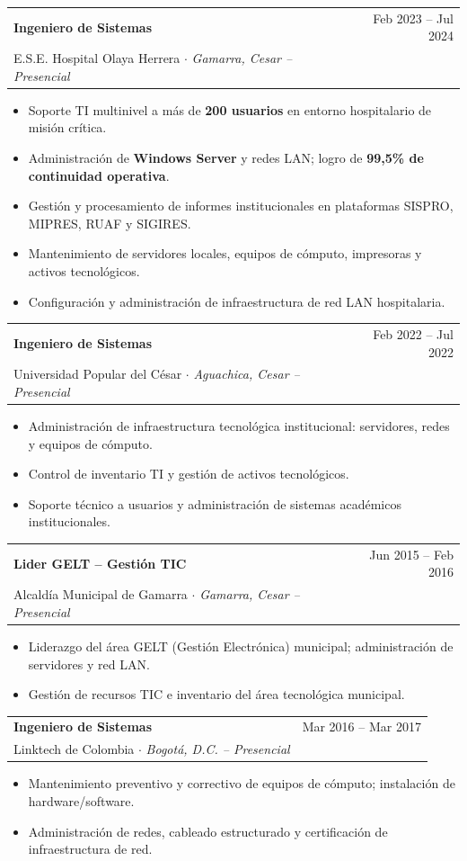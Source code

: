 \documentclass[10pt, letterpaper]{article}
\makeatletter
\newcommand{\cventry}[5]{%
  \noindent
  \begin{tabularx}{\linewidth}{@{}X r@{}}
    {\bfseries\color{primary} #1} & {\small\color{medgray} #2} \\
    {\small\color{accent} #3} $\cdot$ {\small\color{darkgray}\itshape #4} & \\
  \end{tabularx}
  \vspace{2pt}
  #5
  \vspace{6pt}
}
\makeatother
\begin{document}
\cventry
  {Ingeniero de Sistemas}
  {Feb 2023 – Jul 2024}
  {E.S.E. Hospital Olaya Herrera}
  {Gamarra, Cesar – Presencial}
  {
    \begin{itemize}
      \item Soporte TI multinivel a más de \textbf{200 usuarios} en entorno hospitalario de misión crítica.
      \item Administración de \textbf{Windows Server} y redes LAN; logro de \textbf{99,5\% de continuidad operativa}.
      \item Gestión y procesamiento de informes institucionales en plataformas SISPRO, MIPRES, RUAF y SIGIRES.
      \item Mantenimiento de servidores locales, equipos de cómputo, impresoras y activos tecnológicos.
      \item Configuración y administración de infraestructura de red LAN hospitalaria.
    \end{itemize}
  }

\cventry
  {Ingeniero de Sistemas}
  {Feb 2022 – Jul 2022}
  {Universidad Popular del César}
  {Aguachica, Cesar – Presencial}
  {
    \begin{itemize}
      \item Administración de infraestructura tecnológica institucional: servidores, redes y equipos de cómputo.
      \item Control de inventario TI y gestión de activos tecnológicos.
      \item Soporte técnico a usuarios y administración de sistemas académicos institucionales.
    \end{itemize}
  }

\cventry
  {Lider GELT – Gestión TIC}
  {Jun 2015 – Feb 2016}
  {Alcaldía Municipal de Gamarra}
  {Gamarra, Cesar – Presencial}
  {
    \begin{itemize}
      \item Liderazgo del área GELT (Gestión Electrónica) municipal; administración de servidores y red LAN.
      \item Gestión de recursos TIC e inventario del área tecnológica municipal.
    \end{itemize}
  }

\cventry
  {Ingeniero de Sistemas}
  {Mar 2016 – Mar 2017}
  {Linktech de Colombia}
  {Bogotá, D.C. – Presencial}
  {
    \begin{itemize}
      \item Mantenimiento preventivo y correctivo de equipos de cómputo; instalación de hardware/software.
      \item Administración de redes, cableado estructurado y certificación de infraestructura de red.
    \end{itemize}
  }
\end{document}
